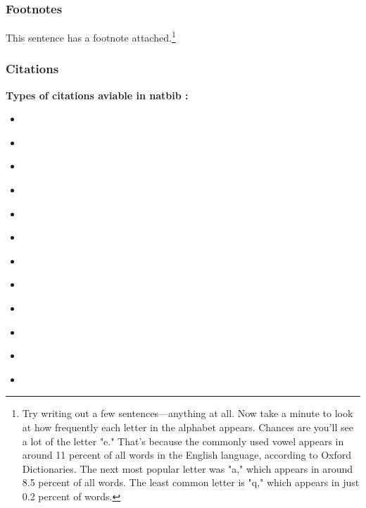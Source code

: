 \subsectionend

\vspace{0.5cm}

\subsubsection{Footnotes}
\label{sssec:footnotes}

\lipsum[1-2]

This sentence has a footnote attached.\footnote{Try writing out a few
	sentences—anything at all. Now take a minute to look at how frequently each
	letter in the alphabet appears.  Chances are you'll see a lot of the letter
	"e." That's because the commonly used vowel appears in around 11 percent of
	all words in the English language, according to Oxford Dictionaries. The
	next most popular letter was "a," which appears in around 8.5 percent of all
	words. The least common letter is "q," which appears in just 0.2 percent of
	words.}


\subsubsectionend

\vspace{0.5cm}

\subsubsection{Citations}
\label{sssec:citations}

\textbf{Types of citations aviable in natbib :}


\begin{itemize}[noitemsep]

	\item \cite{einstein}
	\item \citeauthor{einstein}
	\item \citeauthor*{einstein}
	\item \citeyear{einstein}
	\item \citeyearpar{einstein}
	\item \citet{einstein} 
	\item \citet*{einstein} 
	\item \citet[chap. ~2]{einstein} 
	\item \citep{einstein} 
	\item \citep*{einstein} 
	\item \citep[see][]{einstein} 
	\item \citep[see][chap. ~2]{einstein}

\end{itemize}


